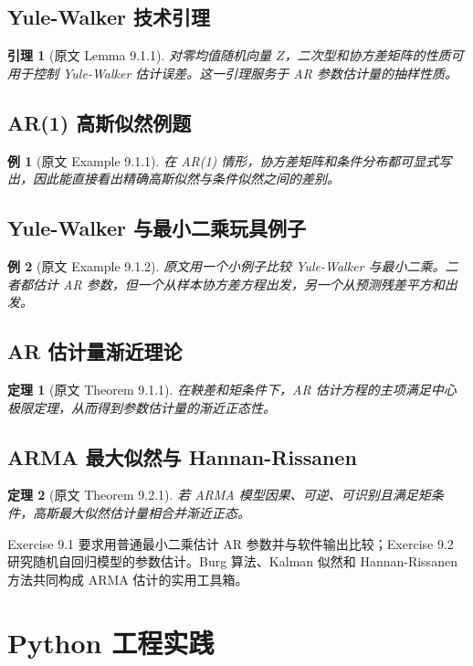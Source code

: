 \documentclass[11pt,a4paper,openany]{ctexbook}
\newtheorem{theorem}{定理}[section]
\newtheorem{lemma}{引理}[section]
\newtheorem{example}{例}[section]
\begin{document}
\subsection{Yule-Walker 技术引理}
\begin{lemma}[原文 Lemma 9.1.1]
对零均值随机向量 \(Z\)，二次型和协方差矩阵的性质可用于控制 Yule-Walker 估计误差。这一引理服务于 AR 参数估计量的抽样性质。
\end{lemma}

\subsection{AR(1) 高斯似然例题}
\begin{example}[原文 Example 9.1.1]
在 AR(1) 情形，协方差矩阵和条件分布都可显式写出，因此能直接看出精确高斯似然与条件似然之间的差别。
\end{example}

\subsection{Yule-Walker 与最小二乘玩具例子}
\begin{example}[原文 Example 9.1.2]
原文用一个小例子比较 Yule-Walker 与最小二乘。二者都估计 AR 参数，但一个从样本协方差方程出发，另一个从预测残差平方和出发。
\end{example}

\subsection{AR 估计量渐近理论}
\begin{theorem}[原文 Theorem 9.1.1]
在鞅差和矩条件下，AR 估计方程的主项满足中心极限定理，从而得到参数估计量的渐近正态性。
\end{theorem}

\subsection{ARMA 最大似然与 Hannan-Rissanen}
\begin{theorem}[原文 Theorem 9.2.1]
若 ARMA 模型因果、可逆、可识别且满足矩条件，高斯最大似然估计量相合并渐近正态。
\end{theorem}

Exercise 9.1 要求用普通最小二乘估计 AR 参数并与软件输出比较；Exercise 9.2 研究随机自回归模型的参数估计。Burg 算法、Kalman 似然和 Hannan-Rissanen 方法共同构成 ARMA 估计的实用工具箱。

\section{Python 工程实践}
\end{document}
